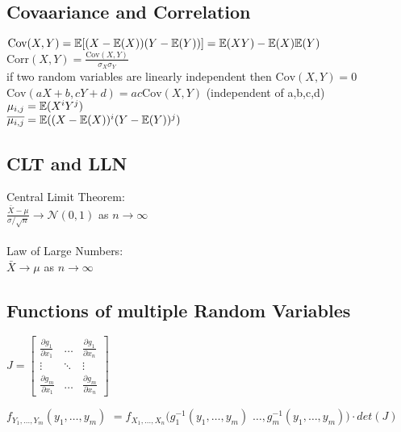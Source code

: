 \subsection{Covaariance and Correlation}
$\text{Cov}(X, Y) = \mathbb{E}[(X - \mathbb{E}(X))(Y - \mathbb{E}(Y))] = \mathbb{E}(XY) - \mathbb{E}(X)\mathbb{E}(Y)$\\
$\text{Corr}(X, Y) = \frac{\text{Cov}(X, Y)}{\sigma_X \sigma_Y}$\\
if two random variables are linearly independent then $\text{Cov}(X, Y) = 0$\\
$\text{Cov}(aX + b, cY + d) = ac \text{Cov}(X, Y)$ (independent of a,b,c,d)\\
$\mu_{i,j} = \mathbb{E}(X^i Y^j)$\\
$\overline{\mu_{i,j}} = \mathbb{E}((X - \mathbb{E}(X))^i (Y - \mathbb{E}(Y))^j)$\\
\subsection{CLT and LLN}
Central Limit Theorem:\\
$\frac{\bar{X} - \mu}{\sigma / \sqrt{n}} \rightarrow \mathcal{N}(0, 1)$ as $n \rightarrow \infty$\\ \\
Law of Large Numbers:\\
$\bar{X} \rightarrow \mu$ as $n \rightarrow \infty$\\

\subsection{Functions of multiple Random Variables}
$J = \begin{bmatrix}
        \frac{\partial g_1}{\partial x_1} & \ldots & \frac{\partial g_1}{\partial x_n} \\
        \vdots & \ddots & \vdots \\
        \frac{\partial g_m}{\partial x_1} & \ldots & \frac{\partial g_m}{\partial x_n}
\end{bmatrix}$\\

\begin{center}
        $f_{Y_1, \ldots, Y_m}(y_1, \ldots, y_m)$
        $=f_{X_1, \ldots, X_n}(g_1^{-1}(y_1, \ldots, y_m)$
        $\ldots, g_m^{-1}(y_1, \ldots, y_m)) \cdot det(J)$\\
\end{center}

